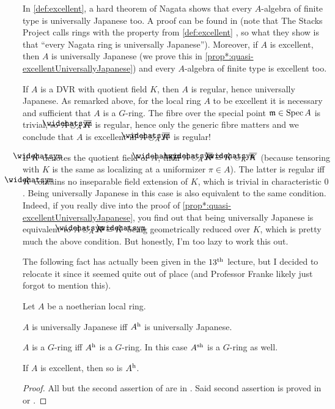 \documentclass[a4paper, 10pt, oneside, DIV=9, chapterprefix=true, numbers=enddot, bibliography=totoc]{scrbook}
\begin{document}
In \cref{def:excellent}, a hard theorem of Nagata shows that every $A$-algebra of finite type is universally Japanese too. A proof can be found in \cite[]{stacks-project} (note that The Stacks Project calls rings with the property from \cref{def:excellent} , so what they show is that \enquote{every Nagata ring is universally Japanese}). Moreover, if $A$ is excellent, then $A$ is universally Japanese (we prove this in \cref{prop*:quasi-excellentUniversallyJapanese}) and every $A$-algebra of finite type is excellent too.
\begin{exm}
	If $A$ is a DVR with quotient field $K$, then $A$ is regular, hence universally Japanese. As remarked above, for the local ring $A$ to be excellent it is necessary and sufficient that $A$ is a $G$-ring. The fibre over the special point $\mathfrak{m}\in\operatorname{Spec} A$ is trivial, so $\roof{A}\otimes_A\ov{K}$ is regular, hence only the generic fibre matters and we conclude that $A$ is excellent iff $\roof{A}\otimes_A\ov{K}$ is regular!
	
	If $\roof{K}$ denotes the quotient field of $\roof{A}$, then $\roof{A}\otimes_A\ov{K}\cong \roof{K}\otimes_K\ov{K}$ (because tensoring with $K$ is the same as localizing at a uniformizer $\pi\in A$). The latter is regular iff $\roof{K}$ contains no inseparable field extension of $K$, which is trivial in characteristic $0$. Being universally Japanese in this case is also equivalent to the same condition. Indeed, if you really dive into the proof of \cref{prop*:quasi-excellentUniversallyJapanese}, you find out that being universally Japanese is equivalent to $\roof{A}\otimes_AK\cong \roof{K}$ being geometrically reduced over $K$, which is pretty much the above condition. But honestly, I'm too lazy to work this out.
\end{exm}
The following fact has actually been given in the $13^{\text{th}}$ lecture, but I decided to relocate it since it seemed quite out of place (and Professor Franke likely just forgot to mention this).
\begin{fact}\label{fact:G-ringStuff}
	Let $A$ be a noetherian local ring.
	\begin{alphanumerate}
		\item $A$ is universally Japanese iff $A^{\mathrm{h}}$ is universally Japanese.
		\item $A$ is a $G$-ring iff $A^{\mathrm{h}}$ is a $G$-ring. In this case $A^{\mathrm{sh}}$ is a $G$-ring as well.
		\item If $A$ is excellent, then so is $A^{\mathrm{h}}$.
	\end{alphanumerate}
\end{fact}
\begin{proof}
	All but the second assertion of  are in \cite[(18.7)]{egaIV4}. Said second assertion is proved in \cite[]{stacks-project} or \cite[end of I.1]{kiehlfreitag}.
\end{proof}
\end{document}
